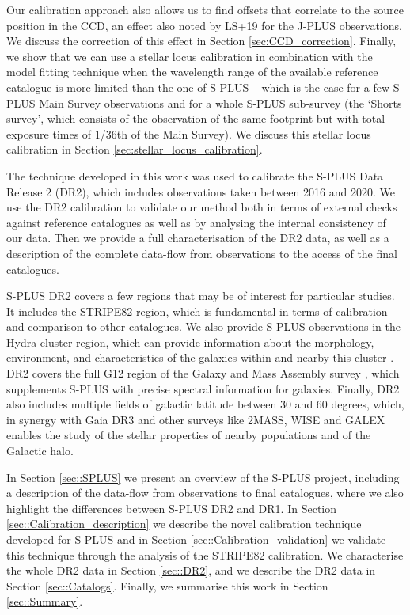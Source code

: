 \documentclass[fleqn,usenatbib]{mnras}
\begin{document}
Our calibration approach also allows us to find offsets that correlate to the source position in the CCD, an effect also noted by LS+19 for the J-PLUS observations. We discuss the correction of this effect in Section \ref{sec:CCD_correction}. Finally, we show that we can use a stellar locus calibration in combination with the model fitting technique when the wavelength range of the available reference catalogue is more limited than the one of S-PLUS -- which is the case for a few S-PLUS Main Survey observations and for a whole S-PLUS sub-survey (the `Shorts survey', which consists of the observation of the same footprint but with total exposure times of 1/36th of the Main Survey). We discuss this stellar locus calibration in Section \ref{sec:stellar_locus_calibration}.

The technique developed in this work was used to calibrate the S-PLUS Data Release 2 (DR2), which includes observations taken between 2016 and 2020. We use the DR2 calibration to validate our method both in terms of external checks against reference catalogues as well as by analysing the internal consistency of our data. Then we provide a full characterisation of the DR2 data, as well as a description of the complete data-flow from observations to the access of the final catalogues.

S-PLUS DR2 covers a few regions that may be of interest for particular studies. It includes the STRIPE82 region, which is fundamental in terms of calibration and comparison to other catalogues. We also provide S-PLUS observations in the Hydra cluster region, which can provide information about the morphology, environment, and characteristics of the galaxies within and nearby this cluster \citep{Lima-Dias+2021}. DR2 covers the full G12 region of the Galaxy and Mass Assembly survey \citep[GAMA,][]{Driver+2009}, which supplements S-PLUS with precise spectral information for galaxies. Finally, DR2 also includes multiple fields of galactic latitude between 30 and 60 degrees, which, in synergy with Gaia DR3 and other surveys like 2MASS, WISE \citep{Wright+2010} and GALEX \citep{Morrissey+2005} enables the study of the stellar properties of nearby populations and of the Galactic halo.  

In Section \ref{sec::SPLUS} we present an overview of the S-PLUS project, including a description of the data-flow from observations to final catalogues, where we also highlight the differences between S-PLUS DR2 and DR1. In Section \ref{sec::Calibration_description} we describe the novel calibration technique developed for S-PLUS and in Section \ref{sec::Calibration_validation} we validate this technique through the analysis of the STRIPE82 calibration. We characterise the whole DR2 data in Section \ref{sec::DR2}, and we describe the DR2 data in Section \ref{sec::Catalogs}. Finally, we summarise this work in Section \ref{sec::Summary}. 
\end{document}
